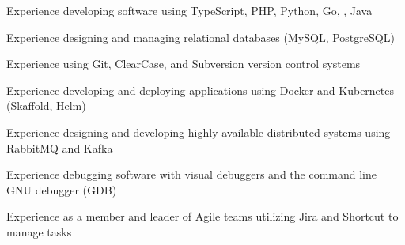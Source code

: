 \documentclass[11pt, letterpaper]{article}
\begin{document}
\begin{itemize*}
  \item Experience developing software using TypeScript, PHP, Python, Go, \CPP, Java %
  \item Experience designing and managing relational databases (MySQL, PostgreSQL)
  \item Experience using Git, ClearCase, and Subversion version control systems
  \item Experience developing and deploying applications using Docker and Kubernetes (Skaffold, Helm)
  \item Experience designing and developing highly available distributed systems using RabbitMQ and Kafka
  \item Experience debugging software with visual debuggers and the command line GNU debugger (GDB)
  \item Experience as a member and leader of Agile teams utilizing Jira and Shortcut to manage tasks
\end{itemize*}
\end{document}
